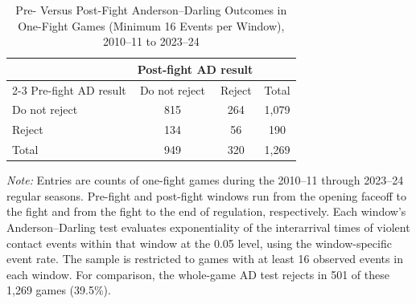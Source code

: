 \begin{table}[htbp]
\centering
\caption{Pre- Versus Post-Fight Anderson--Darling Outcomes in One-Fight Games (Minimum 16 Events per Window), 2010--11 to 2023--24}
\label{tab:one_fight_AD_rejection_min_16_20102011_20232024}
\small
\renewcommand{\arraystretch}{1.15}
\setlength{\tabcolsep}{6pt}

\begin{tabular*}{0.78\textwidth}{@{\extracolsep{\fill}}lccc}
\toprule
 & \multicolumn{2}{c}{Post-fight AD result} & \\
\cmidrule(lr){2-3}
Pre-fight AD result & Do not reject & Reject & Total \\
\midrule
Do not reject & 815 & 264 & 1,079 \\
Reject & 134 & 56 & 190 \\
\midrule
Total & 949 & 320 & 1,269 \\
\bottomrule
\end{tabular*}

\vspace{0.4em}
\parbox{0.78\textwidth}{
\footnotesize
\textit{Note:} Entries are counts of one-fight games during the 2010--11 through 2023--24 regular seasons. Pre-fight and post-fight windows run from the opening faceoff to the fight and from the fight to the end of regulation, respectively. Each window's Anderson--Darling test evaluates exponentiality of the interarrival times of violent contact events within that window at the 0.05 level, using the window-specific event rate. The sample is restricted to games with at least 16 observed events in each window. For comparison, the whole-game AD test rejects in 501 of these 1,269 games (39.5\%).
}
\end{table}
